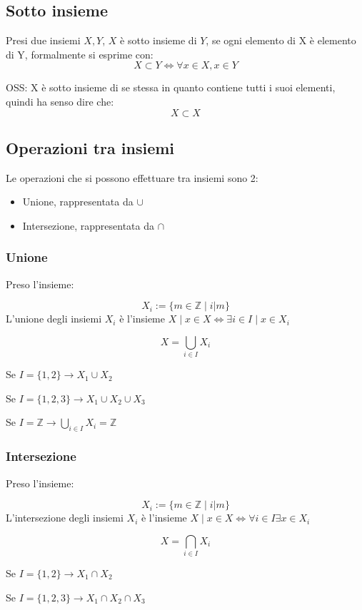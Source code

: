 \documentclass[a4paper,12pt]{article}
\begin{document}
	\subsection{Sotto insieme}
	Presi due insiemi $X, Y$, $X$ è sotto insieme di $Y$, se ogni elemento di X è elemento di Y, formalmente si esprime con:
	\[
	X \subset Y \iff \forall x \in X, x \in Y
	\]
	
	OSS: X è sotto insieme di se stessa in quanto contiene tutti i suoi elementi, quindi ha senso dire che:
	\[
	X \subset X
	\]
	
	\subsection{Operazioni tra insiemi}
	Le operazioni che si possono effettuare tra insiemi sono 2:
	\begin{itemize}
		\item Unione, rappresentata da $\cup$
		\item Intersezione, rappresentata da $\cap$
	\end{itemize}
	
	\subsubsection{Unione}
	Preso l'insieme:
	 
	\[
	X_i := \{m \in \mathbb{Z} \mid i | m\}
	\]
	L'unione degli insiemi $X_i$ è l'insieme $X \mid x\in X \iff \exists i \in I \mid x \in X_i$
	
	\[
	X = \bigcup_{i \in I} X_i
	\]
	
	Se $I = \{1, 2\} \rightarrow X_1 \cup X_2$
	
	Se $I = \{1, 2, 3\} \rightarrow X_1 \cup X_2 \cup X_3$
		
	Se $\displaystyle I = \mathbb{Z} \rightarrow \bigcup_{i \in I} X_i = \mathbb{Z}$
	
	\subsubsection{Intersezione}
	Preso l'insieme:
	
	\[
	X_i := \{m \in \mathbb{Z} \mid i | m\}
	\]
	L'intersezione degli insiemi $X_i$ è l'insieme $X \mid x\in X \iff \forall i \in I \exists x \in X_i$
	
	\[
	X = \bigcap_{i \in I} X_i
	\]
	
	Se $I = \{1, 2\} \rightarrow X_1 \cap X_2$
	
	Se $I = \{1, 2, 3\} \rightarrow X_1 \cap X_2 \cap X_3$
	
\end{document}
